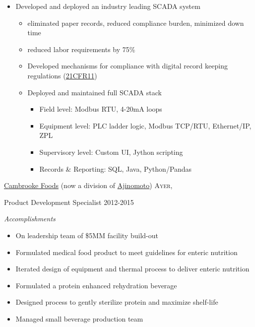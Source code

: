 \documentclass[10pt,a4paper]{article} %
\begin{document}
{{{\begin{itemize}
\item Developed and deployed an industry leading SCADA system
	\begin{itemize}
\item eliminated paper records, reduced compliance burden, minimized down time
\item reduced labor requirements by 75\%
\item Developed mechanisms for compliance with digital record keeping regulations (\href{https://en.m.wikipedia.org/wiki/Title_21_CFR_Part_11}{21CFR11})
\item Deployed and maintained full SCADA stack
		\begin{itemize}
		\item Field level: Modbus RTU, 4-20mA loops
		\item Equipment level: PLC ladder logic, Modbus TCP/RTU, Ethernet/IP, ZPL
		\item Supervisory level: Custom UI, Jython scripting
		\item Records \& Reporting: SQL, Java, Python/Pandas
		\end{itemize}
	\end{itemize}


\end{itemize}
}
}
}
\headedsection %
{\href{http://www.cambrooke.com}{Cambrooke Foods} (now a division of \href{https://www.ajinorthamerica.com/}{Ajinomoto})}
{\textsc{Ayer, }} {

\headedsubsection %
{Product Development Specialist}
{2012-2015}
	{
\emph{Accomplishments }
\begin{itemize}
\item On leadership team of \$5MM facility build-out
\item Formulated medical food product to meet guidelines for enteric nutrition
\item Iterated design of equipment and thermal process to deliver enteric nutrition
\item Formulated a protein enhanced rehydration beverage
\item Designed process to gently sterilize protein and maximize shelf-life
\item Managed small beverage production team
\end{itemize}
	}
}
\end{document}

